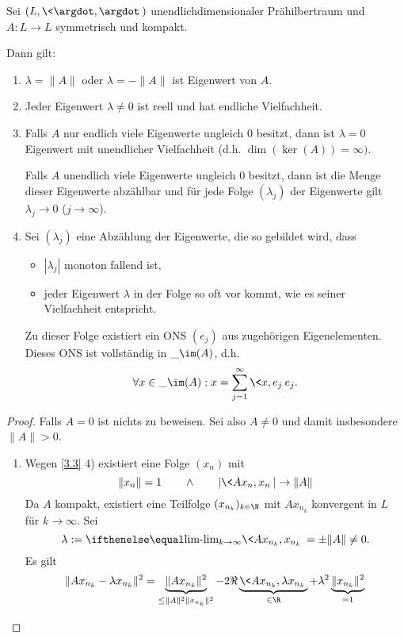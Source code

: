 \begin{st} \label{3.5}
	Sei $(L, \<\argdot,\argdot\>)$ unendlichdimensionaler Prähilbertraum und $A: L \to L$ symmetrisch und kompakt.

	Dann gilt:
	\begin{enumerate}[1)]
		\item
			$\lambda = \|A \|$ oder $\lambda = - \|A\|$ ist Eigenwert von $A$.
		\item
			Jeder Eigenwert $\lambda \neq 0$ ist reell und hat endliche Vielfachheit.
		\item
			Falls $A$ nur endlich viele Eigenwerte ungleich $0$ besitzt, dann ist $\lambda = 0$ Eigenwert mit unendlicher Vielfachheit (d.h. $\dim (\ker (A)) = \infty)$.

			Falls $A$ unendlich viele Eigenwerte ungleich $0$ besitzt, dann ist die Menge dieser Eigenwerte abzählbar und für jede Folge $(\lambda_j)$ der Eigenwerte gilt $\lambda_j \to 0$ ($j \to \infty$).
		\item
			Sei $(\lambda_j)$ eine Abzählung der Eigenwerte, die so gebildet wird, dass
			\begin{itemize}
				\item
					$|\lambda_j|$ monoton fallend ist,
				\item
					jeder Eigenwert $\lambda$ in der Folge so oft vor kommt, wie es seiner Vielfachheit entspricht.
			\end{itemize}
			Zu dieser Folge existiert ein ONS $(e_j)$ aus zugehörigen Eigenelementen.
			Dieses ONS ist vollständig in $\_{\im (A)}$, d.h.
			\[
				\forall x \in \_{\im(A)} : x = \sum_{j=1}^\infty \<x,e_j\> e_j.
			\]
	\end{enumerate}
	\begin{proof}
		Falls $A = 0$ ist nichts zu beweisen.
		Sei also $A \neq 0$ und damit insbesondere $\|A\| > 0$.
		\begin{enumerate}[1)]
			\item
				Wegen \ref{3.3} 4) existiert eine Folge $(x_n)$ mit
				\[
					\|x_n\| = 1 \qquad \land \qquad |\<Ax_n,x_n\>| \to \|A\|
				\]
				Da $A$ kompakt, existiert eine Teilfolge $(x_{n_k})_{k\in \N}$ mit $Ax_{n_k}$ konvergent in $L$ für $k \to \infty$.
				Sei 
				\[
					\lambda := \lim_{k\to\infty} \<Ax_{n_k},x_{n_k}\> = \pm \|A\| \neq 0.
				\]
				Es gilt
				\begin{align*}
					\|Ax_{n_k} - \lambda x_{n_k}\|^2
					&= \underbrace{\|Ax_{n_k} \|^2}_{\le \|A\|^2 \|x_{n_k}\|^2} - 2 \Re \underbrace{\< Ax_{n_k}, \lambda x_{n_k} \>}_{\in \R} + \lambda^2 \underbrace{\|x_{n_k}\|^2}_{=1} \\

\end{align*}
\end{enumerate}
\end{proof}
\end{st}
